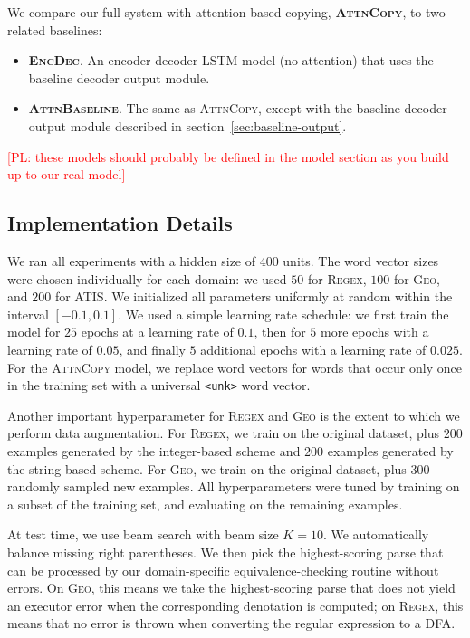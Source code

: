 \documentclass[11pt,letterpaper]{article}
\newcommand{\encdec}{\textsc{EncDec}\xspace}
\newcommand{\attn}{\textsc{AttnBaseline}\xspace}
\newcommand{\attncopy}{\textsc{AttnCopy}\xspace}
\newcommand{\atis}{\textsc{ATIS}\xspace}
\newcommand{\regex}{\textsc{Regex}\xspace}
\newcommand{\geo}{\textsc{Geo}\xspace}
\newcommand\pl[1]{\textcolor{red}{[PL: #1]}}
\begin{document}
We compare our full system with attention-based copying, \textbf{\attncopy}, 
to two related baselines:
\begin{itemize}
  \item \textbf{\encdec}.  An encoder-decoder LSTM model (no attention)
    that uses the baseline decoder output module.
  \item \textbf{\attn}.  The same as \attncopy, except with the baseline decoder
    output module described in section~\ref{sec:baseline-output}.
\end{itemize}
\pl{these models should probably be defined in the model section as you build up to our
real model}

\subsection{Implementation Details}
We ran all experiments with a hidden size of $400$ units.
The word vector sizes were chosen individually for each domain:
we used $50$ for \regex, $100$ for \geo, and $200$ for \atis.
We initialized all parameters uniformly at random 
within the interval $[-0.1, 0.1]$.
We used a simple learning rate schedule:
we first train the model for $25$ epochs at a learning rate of $0.1$,
then for $5$ more epochs with a learning rate of $0.05$,
and finally $5$ additional epochs with a learning rate of $0.025$.
For the \attncopy model, we replace word vectors for words
that occur only once in the training set 
with a universal \texttt{<unk>} word vector.

Another important hyperparameter for \regex and \geo is the
extent to which we perform data augmentation.
For \regex, we train on the original dataset,
plus $200$ examples generated by the integer-based scheme
and $200$ examples generated by the string-based scheme.
For \geo, we train on the original dataset,
plus $300$ randomly sampled new examples.
All hyperparameters were tuned by training on a subset of the
training set, and evaluating on the remaining examples.

At test time, we use beam search with beam size $K=10$.
We automatically balance missing right parentheses.
We then pick the highest-scoring parse 
that can be processed by our domain-specific
equivalence-checking routine without errors.
On \geo, this means we take the highest-scoring parse
that does not yield an executor error when the
corresponding denotation is computed;
on \regex, this means that no error is thrown when 
converting the regular expression to a DFA.
\end{document}
